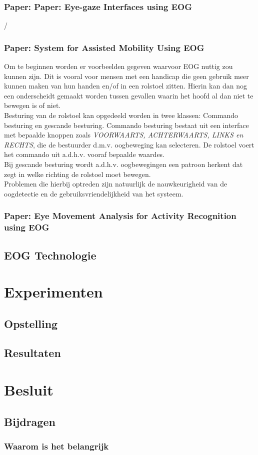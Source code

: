 \documentclass[12pt,a4paper]{article}
\begin{document}
		\subsubsection{Paper: Paper: Eye-gaze Interfaces using EOG}
			/
		\subsubsection{Paper: System for Assisted Mobility Using EOG}
			Om te beginnen worden er voorbeelden gegeven waarvoor EOG nuttig zou kunnen zijn. Dit is vooral voor mensen met een handicap die geen gebruik meer kunnen maken van hun handen en/of in een rolstoel zitten. Hierin kan dan nog een onderscheidt gemaakt worden tussen gevallen waarin het hoofd al dan niet te bewegen is of niet.\\
			
			Besturing van de rolstoel kan opgedeeld worden in twee klassen: Commando besturing en gescande besturing. Commando besturing bestaat uit een interface met bepaalde knoppen zoals \textit{VOORWAARTS, ACHTERWAARTS, LINKS en RECHTS}, die de bestuurder d.m.v. oogbeweging kan selecteren. De rolstoel voert het commando uit a.d.h.v. vooraf bepaalde waardes.\\
			Bij gescande besturing wordt a.d.h.v. oogbewegingen een patroon herkent dat zegt in welke richting de rolstoel moet bewegen.\\
			
			Problemen die hierbij optreden zijn natuurlijk de nauwkeurigheid van de oogdetectie en de gebruiksvriendelijkheid van het systeem.
		\subsubsection{Paper: Eye Movement Analysis for Activity Recognition using EOG}

	\subsection{EOG Technologie}
		
		
\section{Experimenten}
	\subsection{Opstelling}
	\subsection{Resultaten}
\section{Besluit}
	\subsection{Bijdragen}
		\subsubsection{Waarom is het belangrijk}
\end{document}
